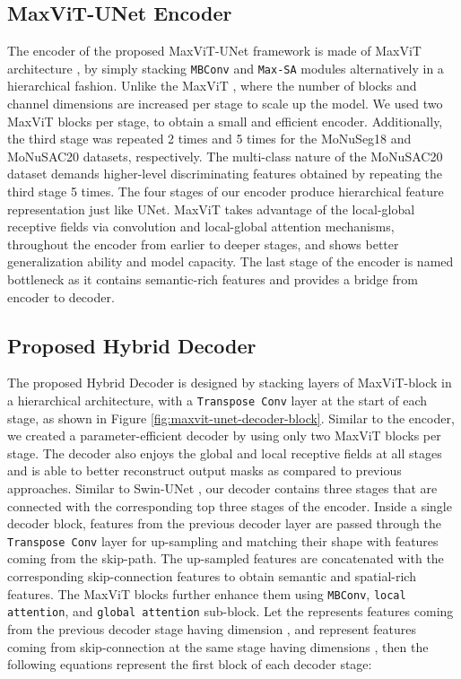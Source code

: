 \documentclass{article}
\begin{document}
\subsection{MaxViT-UNet Encoder}\label{Encoder}

The encoder of the proposed MaxViT-UNet framework is made of MaxViT architecture \cite{tu2022maxvit}, by simply stacking \texttt{MBConv} and \texttt{Max-SA} modules alternatively in a hierarchical fashion. Unlike the MaxViT \cite{tu2022maxvit}, where the number of blocks and channel dimensions are increased per stage to scale up the model. We used two MaxViT blocks per stage, to obtain a small and efficient encoder. Additionally, the third stage was repeated 2 times and 5 times for the MoNuSeg18 and MoNuSAC20 datasets, respectively. The multi-class nature of the MoNuSAC20 dataset demands higher-level discriminating features obtained by repeating the third stage 5 times. The four stages of our encoder produce hierarchical feature representation just like UNet. MaxViT takes advantage of the local-global receptive fields via convolution and local-global attention mechanisms, throughout the encoder from earlier to deeper stages, and shows better generalization ability and model capacity. The last stage of the encoder is named bottleneck as it contains semantic-rich features and provides a bridge from encoder to decoder.

\subsection{Proposed Hybrid Decoder}\label{Decoder}

The proposed Hybrid Decoder is designed by stacking layers of MaxViT-block in a hierarchical architecture, with a \texttt{Transpose Conv} layer at the start of each stage, as shown in Figure \ref{fig:maxvit-unet-decoder-block}. Similar to the encoder, we created a parameter-efficient decoder by using only two MaxViT blocks per stage. The decoder also enjoys the global and local receptive fields at all stages and is able to better reconstruct output masks as compared to previous approaches. Similar to Swin-UNet \cite{cao2022swin}, our decoder contains three stages that are connected with the corresponding top three stages of the encoder. Inside a single decoder block, features from the previous decoder layer are passed through the \texttt{Transpose Conv} layer for up-sampling and matching their shape with features coming from the skip-path. The up-sampled features are concatenated with the corresponding skip-connection features to obtain semantic and spatial-rich features. The MaxViT blocks further enhance them using \texttt{MBConv}, \texttt{local attention}, and \texttt{global attention} sub-block. Let  the represents features coming from the previous decoder stage having dimension , and  represent features coming from skip-connection at the same stage having dimensions , then the following equations represent the first block of each decoder stage:
\end{document}
